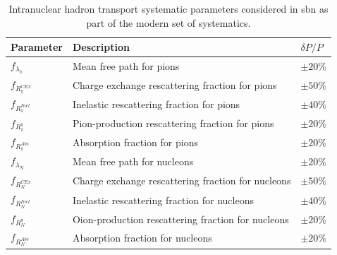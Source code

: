 \begin{table}[!h]
    \renewcommand{\arraystretch}{1.4}
    \begin{tabular}{p{1.9cm} p{9.25cm} p{2.06cm}}
        \toprule
         Parameter & Description & $\delta P / P$ \\
        \midrule
        
         $f_{\lambda_{\pi}}$   &  Mean free path for pions & $ \pm 20 \% $ \\
        
         $f_{R^{CEx}_{\pi}}$    &  Charge exchange rescattering fraction for pions & $ \pm 50 \% $ \\
        
         $f_{R^{Inel}_{\pi}}$   &  Inelastic rescattering fraction for pions & $ \pm 40 \% $ \\
        
         $f_{R^{\pi}_{\pi}}$    &  Pion-production rescattering fraction for pions & $ \pm 20 \% $ \\
        
         $f_{R^{Abs}_{\pi}}$    &  Absorption fraction for pions & $ \pm 20 \% $ \\
        
         $f_{\lambda_{N}}$     &  Mean free path for nucleons & $ \pm 20 \% $ \\
        
         $f_{R^{CEx}_{N}}$      &  Charge exchange rescattering fraction for nucleons & $ \pm 50 \%$ \\
        
         $f_{R^{Inel}_{N}}$     &  Inelastic rescattering fraction for nucleons & $ \pm 40 \% $ \\
        
         $f_{R^{\pi}_{N}}$      &  Oion-production rescattering fraction for nucleons & $ \pm 20 \% $ \\
        
         $f_{R^{Abs}_{N}}$      &  Absorption fraction for nucleons & $ \pm 20 \% $ \\

        \bottomrule
    \end{tabular}
    \caption[Intranuclear hadron transport systematic parameters.]{Intranuclear hadron transport systematic parameters  considered in \gls{sbn} as part of the modern set of systematics\cite{GENIE_manual}.}
    \label{table:modern_intranuclear_syst}
\end{table}

